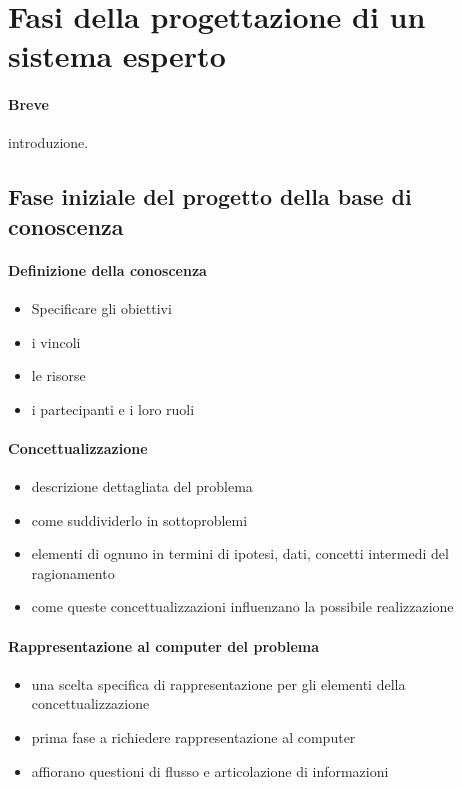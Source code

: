 \section{Fasi della progettazione di un sistema esperto}
\paragraph{Breve} introduzione.


\subsection{Fase iniziale del progetto della base di conoscenza}

\paragraph{Definizione della conoscenza}

\begin{itemize}
  \item {Specificare gli obiettivi}
  \item {i vincoli}
  \item {le risorse}
  \item {i partecipanti e i loro ruoli}
\end{itemize}

\paragraph{Concettualizzazione}
\begin{itemize}
  \item {descrizione dettagliata del problema}
  \item {come suddividerlo in sottoproblemi}
  \item {elementi di ognuno in termini di ipotesi, dati, concetti intermedi del ragionamento}
  \item {come queste concettualizzazioni influenzano la possibile realizzazione}
\end{itemize}

\paragraph{Rappresentazione al computer del problema}
\begin{itemize}
  \item{una scelta specifica di rappresentazione per gli elementi della concettualizzazione}
  \item{prima fase a richiedere rappresentazione al computer}
  \item{affiorano questioni di flusso e articolazione di informazioni}
\end{itemize}


